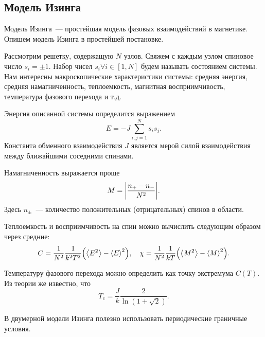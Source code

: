 \documentclass[12pt,a4paper]{article}
\begin{document}
        \subsection{Модель Изинга}

            Модель Изинга~--- простейшая модель фазовых взаимодействий в магнетике. Опишем модель Изинга в простейшей постановке.

            Рассмотрим решетку, содержащую $N$ узлов. Свяжем с каждым узлом спиновое число $s_i=\pm 1$. Набор чисел ${s_i} \forall i \in [1,N]$ будем называть состоянием системы. Нам интересны макроскопические характеристики системы: средняя энергия, средняя намагниченность, теплоемкость, магнитная восприимчивость, температура фазового перехода и т.д.

            Энергия описанной системы определится выражением
            \begin{equation*}
                E = -J \sum\limits_{i,j=1}^N s_i s_j .
            \end{equation*}
            Константа обменного взаимодействия $J$ является мерой силой взаимодействия между ближайшими соседними спинами.

            Намагниченность выражается проще
            \begin{equation*}
                M = \qty|\frac{n_{+} - n_{-}}{N^2}| .
            \end{equation*}
            Здесь $n_{\pm}$~--- количество положительных (отрицательных) спинов в области.

            Теплоемкость и восприимчивость на спин можно вычислить следующим образом через средние:
            \begin{equation*}
                C = \frac{1}{N^2} \frac{1}{k^2 T^2} \qty(\left<E^2\right> - \left<E\right>^2), \quad
                \chi = \frac{1}{N^2} \frac{1}{kT} \qty(\left<M^2\right> - \left<M\right>^2) .
            \end{equation*}

            Температуру фазового перехода можно определить как точку экстремума $C(T)$. Из теории же известно, что
            \begin{equation*}
                T_c = \frac{J}{k} \frac{2}{\ln(1+\sqrt{2})} .
            \end{equation*}

            В двумерной модели Изинга полезно использовать периодические граничные условия.
\end{document}
